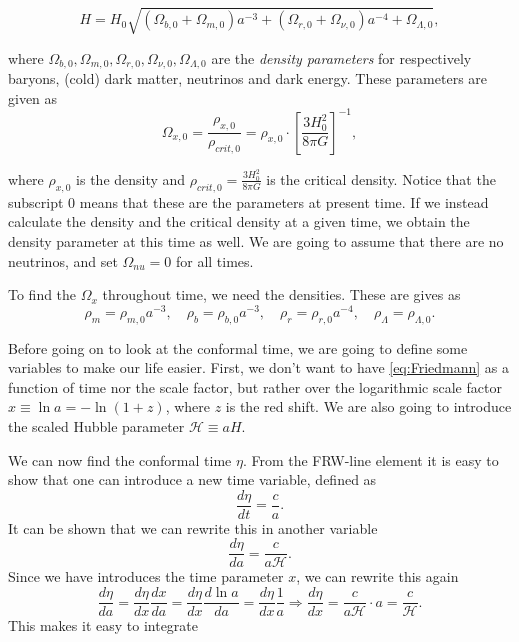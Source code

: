 \documentclass[a4paper,norsk, 10pt]{article}
\begin{document}
\begin{equation}\label{eq:Friedmann}
H = H_0 \sqrt{(\Omega_{b,0} + \Omega_{m,0})a^{-3} + (\Omega_{r,0} + \Omega_{\nu,0})a^{-4} + \Omega_{\Lambda,0}},
\end{equation}

where $\Omega_{b,0}, \Omega_{m,0}, \Omega_{r,0}, \Omega_{\nu,0}, \Omega_{\Lambda,0}$ are the \textit{density parameters} for respectively baryons, (cold) dark matter, neutrinos and dark energy. These parameters are given as
\begin{equation}\label{eq:Omega}
\Omega_{x,0} = \frac{\rho_{x,0}}{\rho_{crit,0}} = \rho_{x,0}\cdot\left[\frac{3H_0^2}{8\pi G}\right]^{-1},
\end{equation}

where $\rho_{x,0}$ is the density and $\rho_{crit,0} = \frac{3H_0^2}{8\pi G}$ is the critical density. Notice that the subscript $0$ means that these are the parameters at present time. If we instead calculate the density and the critical density at a given time, we obtain the density parameter at this time as well. We are going to assume that there are no neutrinos, and set $\Omega_{nu} = 0$ for all times.

To find the $\Omega_{x}$ throughout time, we need the densities. These are gives as
\begin{equation}\label{eq:rho}
\rho_{m} = \rho_{m,0} a^{-3}, \quad \rho_{b} = \rho_{b,0} a^{-3}, \quad \rho_{r} = \rho_{r,0} a^{-4}, \quad \rho_{\Lambda} = \rho_{\Lambda,0}.
\end{equation}

Before going on to look at the conformal time, we are going to define some variables to make our life easier. First, we don't want to have \eqref{eq:Friedmann} as a function of time nor the scale factor, but rather over the logarithmic scale factor $x \equiv \ln a = - \ln(1+z)$, where $z$ is the red shift. We are also going to introduce the scaled Hubble parameter $\mathcal{H} \equiv aH$.

We can now find the conformal time $\eta$. From the FRW-line element it is easy to show that one can introduce a new time variable, defined as
\begin{equation}
\frac{d\eta}{dt} = \frac{c}{a}.
\end{equation}
It can be shown that we can rewrite this in another variable
\begin{equation}
\frac{d \eta}{da} = \frac{c}{a\mathcal{H}}.
\end{equation}
Since we have introduces the time parameter $x$, we can rewrite this again
\begin{equation}\label{eq:deta/dx}
\frac{d\eta}{da} = \frac{d\eta}{dx}\frac{dx}{da} = \frac{d\eta}{dx}\frac{d \ln a}{da} = \frac{d\eta}{dx}\frac{1}{a} \Rightarrow \frac{d\eta}{dx} = \frac{c}{a\mathcal{H}}\cdot a = \frac{c}{\mathcal{H}}.
\end{equation}
This makes it easy to integrate 
\end{document}
